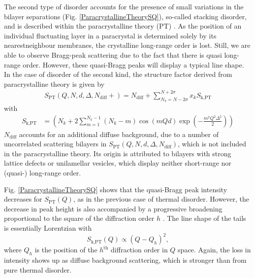 The second type of disorder accounts for the presence of small
variations in the bilayer separations (Fig.
\ref{ParacrystallineTheorySQ}), so-called stacking disorder, and is
described within the paracrystalline theory (PT)
\cite{Hosemann1962,Guinier1963,Blaurock1982,Pabst2003,Fruhwirth2004}. As the position of an
individual fluctuating layer in a paracrystal is determined solely
by its nearestneighbour membranes, the crystalline long-range order
is lost. Still, we are able to observe Bragg-peak scattering due to
the fact that there is quasi long-range order. However, these
quasi-Bragg peaks will display a typical line shape. In the case of
disorder of the second kind, the structure factor derived from
paracrystalline theory is given by \cite{Guinier1963}
\begin{align}
S_\text{PT}(Q,N,d,\Delta,N_\text{diff}+) = N_\text{diff}+\sum_{N_k=N-2\sigma}^{N+2\sigma} x_k
S_\text{k,PT}
\end{align}
with
\begin{align}
S_\text{k,PT} &= \left( N_k + 2 \sum_{m=1}^{N_k-1} (N_k-m)
\cos(mQd) \exp\left( -\frac{m^2Q^2\Delta^2}{2}\right) \right)
\end{align}
$N_\text{diff}$ accounts for an additional
diffuse background, due to a number of uncorrelated
scattering bilayers in $S_\text{PT}(Q,N,d,\Delta,N_\text{diff})$,
which is not included in the paracrystalline theory.
Its origin is attributed to bilayers with strong lattice defects or
unilamellar vesicles, which display neither short-range nor
(quasi-) long-range order.

Fig. \ref{ParacrystallineTheorySQ} shows that the quasi-Bragg peak
intensity decreases for $S_\text{PT}(Q)$, as in the previous case of
thermal disorder. However, the decrease in peak height is also
accompanied by a progressive broadening proportional to the square
of the diffraction order $h$ \cite{Schwartz1975}. The line shape of
the tails is essentially Lorentzian with
$$S_\text{k,PT}(Q) \propto (Q - Q_h)^2,$$
where $Q_h$ is the position of the $h^\text{th}$ diffraction order
in $Q$ space. Again, the loss in intensity shows up as diffuse
background scattering, which is stronger than from pure thermal
disorder.


